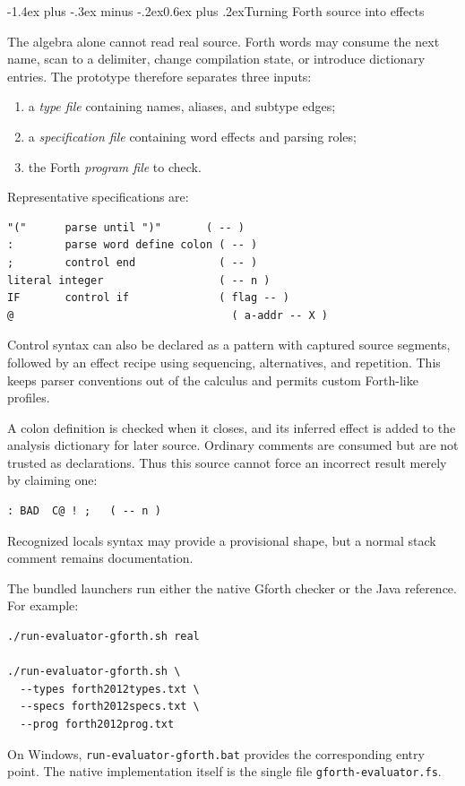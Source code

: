 \documentclass[a4paper,10pt]{article}
\makeatletter
\renewcommand\section{\@startsection{section}{1}{\z@}%
  {-1.4ex plus -.3ex minus -.2ex}{0.6ex plus .2ex}{\large\bfseries}}
\makeatother
\begin{document}
\section{Turning Forth source into effects}

The algebra alone cannot read real source.  Forth words may consume the next
name, scan to a delimiter, change compilation state, or introduce dictionary
entries.  The prototype therefore separates three inputs:
\begin{enumerate}
  \item a \emph{type file} containing names, aliases, and subtype edges;
  \item a \emph{specification file} containing word effects and parsing roles;
  \item the Forth \emph{program file} to check.
\end{enumerate}
Representative specifications are:
\begin{lstlisting}
"("      parse until ")"       ( -- )
:        parse word define colon ( -- )
;        control end             ( -- )
literal integer                  ( -- n )
IF       control if              ( flag -- )
@                                  ( a-addr -- X )
\end{lstlisting}
Control syntax can also be declared as a pattern with captured source
segments, followed by an effect recipe using sequencing, alternatives, and
repetition.  This keeps parser conventions out of the calculus and permits
custom Forth-like profiles.

A colon definition is checked when it closes, and its inferred effect is added
to the analysis dictionary for later source.  Ordinary comments are consumed
but are not trusted as declarations.  Thus this source cannot force an
incorrect result merely by claiming one:
\begin{lstlisting}
: BAD  C@ ! ;   ( -- n )
\end{lstlisting}
Recognized locals syntax may provide a provisional shape, but a normal stack
comment remains documentation.

The bundled launchers run either the native Gforth checker or the Java
reference.  For example:
\begin{lstlisting}
./run-evaluator-gforth.sh real

./run-evaluator-gforth.sh \
  --types forth2012types.txt \
  --specs forth2012specs.txt \
  --prog forth2012prog.txt
\end{lstlisting}
On Windows, \texttt{run-evaluator-gforth.bat} provides the corresponding
entry point.  The native implementation itself is the single file
\texttt{gforth-evaluator.fs}.
\end{document}
